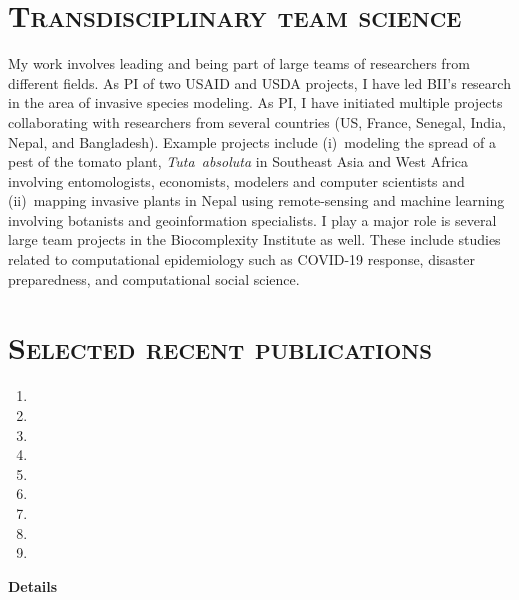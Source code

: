 \documentclass[margin,10pt]{res} %
\newcommand{\tutafull}{\emph{Tuta~absoluta}}
\begin{document}
\begin{resume}
\section{\textnormal{\textsc{Transdisciplinary team science}}}
My work involves leading and being part of large teams of researchers from
different fields.  As PI of two USAID and USDA projects, I have led BII’s
research in the area of invasive species modeling. As PI, I have initiated
multiple projects collaborating with researchers from several countries
(US, France, Senegal, India, Nepal, and Bangladesh). Example projects
include (i)~modeling the spread of a pest of the tomato plant, \tutafull{} in
Southeast Asia and West Africa involving entomologists, economists,
modelers and computer scientists and (ii)~mapping invasive plants in Nepal
using remote-sensing and machine learning involving botanists and
geoinformation specialists. I play a major role is several large team projects in the
Biocomplexity Institute as well. These include studies related to
computational epidemiology such as COVID-19 response, disaster
preparedness, and computational social science.

\section{\textnormal{\textsc{Selected recent publications}}}
\nobibliography*
\begin{enumerate}[$\circ$]
\item {}
\item {}
\item {}
\item {}
\item {}
\item {}
\item {}
\item {}
\item {}
\end{enumerate}


\clearpage


\end{resume}

\clearpage
{}\hoffset\centerline{\large\bf Details\hfill} %
 
\end{document}
